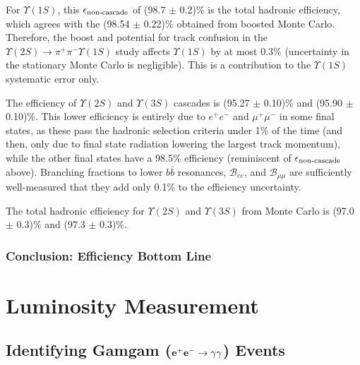 \documentclass[aps,prd,preprint,superscriptaddress,tightenlines,nofootinbib,floatfix]{revtex4}
\begin{document}
For $\Upsilon(1S)$, this $\epsilon_{\mbox{\scriptsize non-cascade}}$ of (98.7 $\pm$
0.2)\% is the total hadronic efficiency, which agrees with the (98.54
$\pm$ 0.22)\% obtained from boosted Monte Carlo.  Therefore, the boost
and potential for track confusion in the $\Upsilon(2S) \to \pi^+\pi^-
\Upsilon(1S)$ study affects $\Upsilon(1S)$ by at most 0.3\%
(uncertainty in the stationary Monte Carlo is negligible).  This is a
contribution to the $\Upsilon(1S)$ systematic error only.

The efficiency of $\Upsilon(2S)$ and $\Upsilon(3S)$ cascades is (95.27
$\pm$ 0.10)\% and (95.90 $\pm$ 0.10)\%.  This lower efficiency is
entirely due to $e^+e^-$ and $\mu^+\mu^-$ in some final states, as
these pass the hadronic selection criteria under 1\% of the time (and
then, only due to final state radiation lowering the largest track
momentum), while the other final states have a 98.5\% efficiency
(reminiscent of $\epsilon_{\mbox{\scriptsize non-cascade}}$ above).  Branching
fractions to lower $b\bar{b}$ resonances, $\mathcal{B}_{ee}$, and
$\mathcal{B}_{\mu\mu}$ are sufficiently well-measured that they add
only 0.1\% to the efficiency uncertainty.

The total hadronic efficiency for $\Upsilon(2S)$ and $\Upsilon(3S)$
from Monte Carlo is (97.0 $\pm$ 0.3)\% and (97.3 $\pm$ 0.3)\%.

%
\subsubsection{Conclusion: Efficiency Bottom Line}
%






%
\section{Luminosity Measurement}
%

%
\subsection{Identifying Gamgam ($\bf e^+e^- \to \gamma\gamma$) Events}
%
\end{document}

